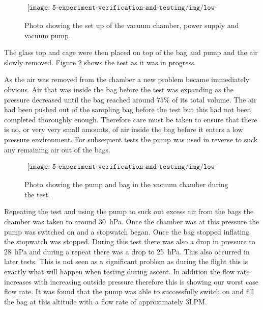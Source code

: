 \begin{figure}[H]
    \begin{align*}
        \texttt{[image: 5-experiment-verification-and-testing/img/low-pressure-set-up.png]}
    \end{align*}
    \caption {Photo showing the set up of the vacuum chamber, power supply and vacuum pump. }\label{fig:pump-low-pressure-set-up}
\end{figure}

The glass top and cage were then placed on top of the bag and pump and the air slowly removed. Figure \ref{fig:pump-low-pressure-progress} shows the test as it was in progress. 

As the air was removed from the chamber a new problem became immediately obvious. Air that was inside the bag before the test was expanding as the pressure decreased until the bag reached around $75\%$ of its total volume. The air had been pushed out of the sampling bag before the test but this had not been completed thoroughly enough. Therefore care must be taken to ensure that there is no, or very very small amounts, of air inside the bag before it enters a low pressure environment. For subsequent tests the pump was used in reverse to suck any remaining air out of the bags. 

\begin{figure}[H]
    \begin{align*}
        \texttt{[image: 5-experiment-verification-and-testing/img/low-pressure-in-progress.png]}
    \end{align*}
    \caption {Photo showing the pump and bag in the vacuum chamber during the test.} \label{fig:pump-low-pressure-progress}
\end{figure}

Repeating the test and using the pump to suck out excess air from the bags the chamber was taken to around \SI{30}{\hecto\pascal}. Once the chamber was at this pressure the pump was switched on and a stopwatch began. Once the bag stopped inflating the stopwatch was stopped. During this test there was also a drop in pressure to \SI{28}{\hecto\pascal} and during a repeat there was a drop to \SI{25}{\hecto\pascal}. This also occurred in later tests. This is not seen as a significant problem as during the flight this is exactly what will happen when testing during ascent. In addition the flow rate increases with increasing outside pressure therefore this is showing our worst case flow rate. It was found that the pump was able to successfully switch on and fill the bag at this altitude with a flow rate of approximately 3LPM. 

